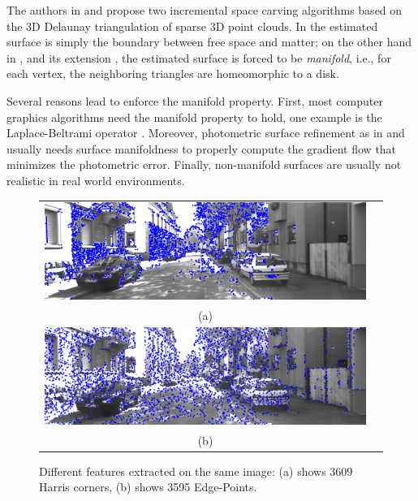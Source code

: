 The authors in \cite{lovi_et_al_11}  and \cite{litvinov_lhuillier_13} propose two incremental space carving algorithms based on the 3D Delaunay triangulation of sparse 3D point clouds. 
In \cite{lovi_et_al_11} the estimated surface is simply the boundary between free space and matter; on the other hand in \cite{litvinov_lhuillier_13}, and its extension \cite{litvinov_Lhiuller14}, the estimated surface is forced to be \emph{manifold}, i.e., for each vertex, the neighboring triangles are homeomorphic to a disk. 

Several reasons lead to enforce the manifold property. First, most computer graphics algorithms need the manifold property to hold, one example is the Laplace-Beltrami operator \cite{Meyer03}.
Moreover, photometric surface refinement as in \cite{vu_et_al_2012} and \cite{delaunoy_et_al_08} usually needs surface manifoldness to properly compute the gradient flow that minimizes the photometric error. Finally, non-manifold surfaces are usually not realistic in real world environments.


\begin{figure}[tp]
\centering
\begin{tabular}{cc}
\includegraphics[width=0.98\columnwidth]{./img//harris}\\
(a)\\
\includegraphics[width=0.98\columnwidth]{./img//edgepoints}\\
(b)\\
\end{tabular}
\caption{Different features extracted on the same image: (a) shows 3609 Harris corners, (b) shows 3595 Edge-Points.}
\label{fig:Edge-Points}
\end{figure}


